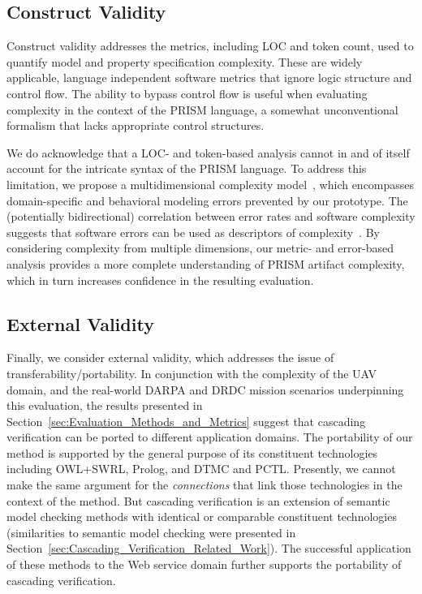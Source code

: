 \subsection{Construct Validity}

Construct validity addresses the metrics, including LOC and token count, used to quantify model and property specification complexity. These are widely applicable, language independent software metrics that ignore logic structure and control flow. The ability to bypass control flow is useful when evaluating complexity in the context of the PRISM language, a somewhat unconventional formalism that lacks appropriate control structures.

We do acknowledge that a LOC- and token-based analysis cannot in and of itself account for the intricate syntax of the PRISM language. To address this limitation, we propose a multidimensional complexity model~\cite{Kaner_2004}, which encompasses domain-specific and behavioral modeling errors prevented by our prototype. The (potentially bidirectional) correlation between error rates and software complexity suggests that software errors can be used as descriptors of complexity~\cite{Banker_1989,Kan_2002}. By considering complexity from multiple dimensions, our metric- and error-based analysis provides a more complete understanding of PRISM artifact complexity, which in turn increases confidence in the resulting evaluation.

\subsection{External Validity}

Finally, we consider external validity, which addresses the issue of transferability/portability. In conjunction with the complexity of the UAV domain, and the real-world DARPA and DRDC mission scenarios underpinning this evaluation, the results presented in Section~\ref{sec:Evaluation_Methods_and_Metrics} suggest that cascading verification can be ported to different application domains. The portability of our method is supported by the general purpose of its constituent technologies including OWL+SWRL, Prolog, and DTMC and PCTL\@. Presently, we cannot make the same argument for the \emph{connections} that link those technologies in the context of the method. But cascading verification is an extension of semantic model checking methods with identical or comparable constituent technologies (similarities to semantic model checking were presented in Section~\ref{sec:Cascading_Verification_Related_Work}). The successful application of these methods to the Web service domain further supports the portability of cascading verification.

